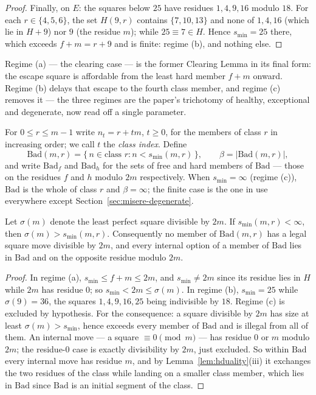 \begin{proof}
Finally, on $E$: the squares below $25$ have residues $1, 4, 9, 16$
modulo $18$. For each $r \in \{4, 5, 6\}$, the set $H(9,r)$ contains
$\{7, 10, 13\}$ and none of $1, 4, 16$ (which lie in $H + 9$) nor $9$
(the residue $m$); while $25 \equiv 7 \in H$. Hence $s_{\min} = 25$
there, which exceeds $f + m = r + 9$ and is finite: regime (b), and
nothing else.
\end{proof}

Regime (a) --- the clearing case --- is the former Clearing Lemma in its
final form: the escape square is affordable from the least hard member
$f + m$ onward. Regime (b) delays that escape to the fourth class member,
and regime (c) removes it --- the three regimes are the paper's
trichotomy of healthy, exceptional and degenerate, now read off a single
parameter.

\begin{definition}\label{def:bad}
For $0 \le r \le m-1$ write $n_t = r + tm$, $t \ge 0$, for the members of
class $r$ in increasing order; we call $t$ the \emph{class index}. Define
\[ \mathrm{Bad}(m,r) = \{\, n \in \text{class } r : n < s_{\min}(m,r) \,\},
\qquad \beta = |\mathrm{Bad}(m,r)|, \]
and write $\mathrm{Bad}_f$ and $\mathrm{Bad}_h$ for the sets of free and
hard members of $\mathrm{Bad}$ --- those on the residues $f$ and $h$
modulo $2m$ respectively. When $s_{\min} = \infty$ (regime (c)),
$\mathrm{Bad}$ is the whole of class $r$ and $\beta = \infty$; the finite
case is the one in use everywhere except Section~\ref{sec:misere-degenerate}.
\end{definition}

\begin{lemma}\label{lem:nodeep}
Let $\sigma(m)$ denote the least perfect square divisible by $2m$. If
$s_{\min}(m,r) < \infty$, then $\sigma(m) > s_{\min}(m,r)$. Consequently
no member of $\mathrm{Bad}(m,r)$ has a legal square move divisible by
$2m$, and every internal option of a member of $\mathrm{Bad}$ lies in
$\mathrm{Bad}$ and on the opposite residue modulo $2m$.
\end{lemma}
\begin{proof}
In regime (a), $s_{\min} \le f + m \le 2m$, and $s_{\min} \ne 2m$ since
its residue lies in $H$ while $2m$ has residue $0$; so
$s_{\min} < 2m \le \sigma(m)$. In regime (b), $s_{\min} = 25$ while
$\sigma(9) = 36$, the squares $1, 4, 9, 16, 25$ being indivisible by
$18$. Regime (c) is excluded by hypothesis. For the consequence: a square
divisible by $2m$ has size at least $\sigma(m) > s_{\min}$, hence exceeds
every member of $\mathrm{Bad}$ and is illegal from all of them. An
internal move --- a square $\equiv 0 \pmod m$ --- has residue $0$ or $m$
modulo $2m$; the residue-$0$ case is exactly divisibility by $2m$, just
excluded. So within $\mathrm{Bad}$ every internal move has residue $m$,
and by Lemma~\ref{lem:hduality}(iii) it exchanges the two residues of the
class while landing on a smaller class member, which lies in
$\mathrm{Bad}$ since $\mathrm{Bad}$ is an initial segment of the class.
\end{proof}

